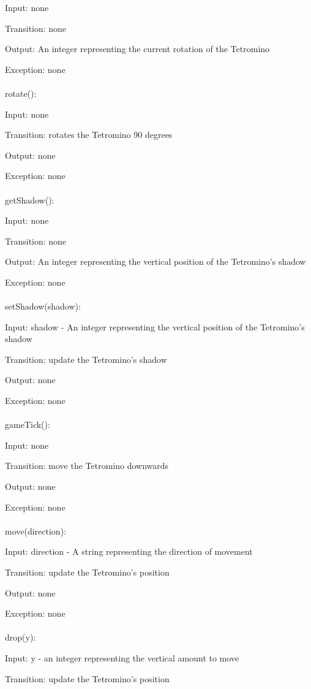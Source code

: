 \documentclass[12,english]{article}
\begin{document}
			Input: none
			
			Transition: none
			
			Output: An integer representing the current rotation of the Tetromino
			
			Exception: none\\
			\\
			rotate():
			
			Input: none
			
			Transition: rotates the Tetromino 90 degrees
			
			Output: none
			
			Exception: none\\
			\\		
			getShadow():
			
			Input: none
			
			Transition: none
			
			Output: An integer representing the vertical position of the Tetromino's shadow
			
			Exception: none\\
			\\	
			setShadow(shadow):
			
			Input: shadow - An integer representing the vertical position of the Tetromino's shadow
			
			Transition: update the Tetromino's shadow
			
			Output: none
			
			Exception: none\\
			\\	
			gameTick():
			
			Input: none
			
			Transition: move the Tetromino downwards 
			
			Output: none
			
			Exception: none\\
			\\	
			move(direction):
			
			Input: direction - A string representing the direction of movement
			
			Transition: update the Tetromino's position
			
			Output: none
			
			Exception: none\\
			\\	
			drop(y):
			
			Input: y - an integer representing the vertical amount to move
			
			Transition: update the Tetromino's position
			
\end{document}
